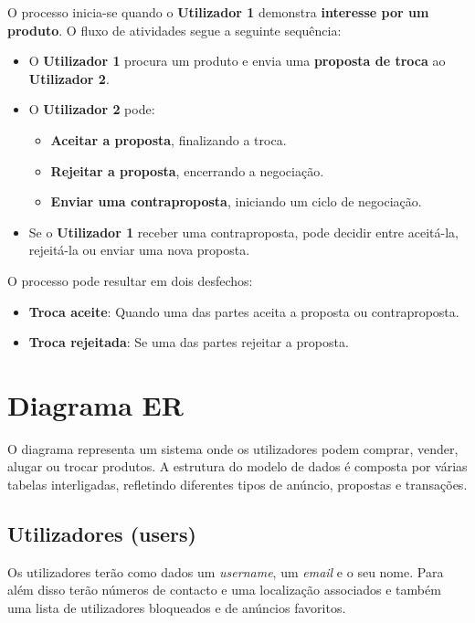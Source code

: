 \documentclass[a4paper, 12pt]{article} %
\begin{document}
O processo inicia-se quando o \textbf{Utilizador 1} demonstra \textbf{interesse por um produto}. O fluxo de atividades segue a seguinte sequência:

\begin{itemize}
	\item O \textbf{Utilizador 1} procura um produto e envia uma \textbf{proposta de troca} ao \textbf{Utilizador 2}.
	\item O \textbf{Utilizador 2} pode:
	\begin{itemize}
		\item \textbf{Aceitar a proposta}, finalizando a troca.
		\item \textbf{Rejeitar a proposta}, encerrando a negociação.
		\item \textbf{Enviar uma contraproposta}, iniciando um ciclo de negociação.
	\end{itemize}
	\item Se o \textbf{Utilizador 1} receber uma contraproposta, pode decidir entre aceitá-la, rejeitá-la ou enviar uma nova proposta.
\end{itemize}

O processo pode resultar em dois desfechos:
\begin{itemize}
	\item \textbf{Troca aceite}: Quando uma das partes aceita a proposta ou contraproposta.
	\item \textbf{Troca rejeitada}: Se uma das partes rejeitar a proposta.
\end{itemize}
\newpage
\section{Diagrama ER}

O diagrama representa um sistema onde os utilizadores podem comprar, vender, alugar ou trocar produtos. A estrutura do modelo de dados é composta por várias tabelas interligadas, refletindo diferentes tipos de anúncio, propostas e transações.


\subsection{\textbf{Utilizadores (users)}}
Os utilizadores terão como dados um \textit{username}, um \textit{email} e o seu nome. Para além disso terão números de contacto e uma localização associados e também uma lista de utilizadores bloqueados e de anúncios favoritos.
\end{document}
